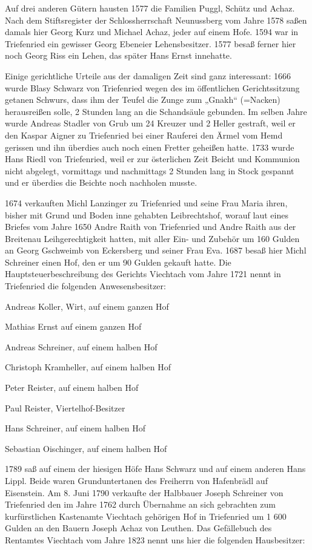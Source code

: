 \documentclass[12pt,a4pager]{book}
\begin{document}
Auf drei anderen Gütern hausten 1577 die Familien Puggl, Schütz und Achaz. Nach
dem Stiftsregister der Schlossherrschaft Neunussberg vom Jahre 1578 saßen damals
hier Georg Kurz und Michael Achaz, jeder auf einem Hofe. 1594 war in Triefenried
ein gewisser Georg Ebeneier Lehensbesitzer. 1577 besaß ferner hier noch Georg
Riss ein Lehen, das später Hans Ernst innehatte.

Einige gerichtliche Urteile aus der damaligen Zeit sind ganz interessant: 1666
wurde Blasy Schwarz von Triefenried wegen des im öffentlichen Gerichtssitzung
getanen Schwurs, dass ihm der Teufel die Zunge zum „Gnakh“ (=Nacken)
herausreißen solle, 2 Stunden lang an die Schandsäule gebunden. Im selben Jahre
wurde Andreas Stadler von Grub um 24 Kreuzer und 2 Heller gestraft, weil er den
Kaspar Aigner zu Triefenried bei einer Rauferei den Ärmel vom Hemd gerissen und
ihn überdies auch noch einen Fretter geheißen hatte. 1733 wurde Hans Riedl von
Triefenried, weil er zur österlichen Zeit Beicht und Kommunion nicht abgelegt,
vormittags und nachmittags 2 Stunden lang in Stock gespannt und er überdies die
Beichte noch nachholen musste.

1674 verkauften Michl Lanzinger zu Triefenried und seine Frau Maria ihren,
bisher mit Grund und Boden inne gehabten Leibrechtshof, worauf laut eines
Briefes vom Jahre 1650 Andre Raith von Triefenried und Andre Raith aus der
Breitenau Leihgerechtigkeit hatten, mit aller Ein- und Zubehör um 160 Gulden an
Georg Gschweimb von Eckersberg und seiner Frau Eva. 1687 besaß hier Michl
Schreiner einen Hof, den er um 90 Gulden gekauft hatte. Die
Hauptsteuerbeschreibung des Gerichts Viechtach vom Jahre 1721 nennt in
Triefenried die folgenden Anwesensbesitzer:

Andreas Koller, Wirt, auf einem ganzen Hof

Mathias Ernst auf einem ganzen Hof

Andreas Schreiner, auf einem halben Hof

Christoph Kramheller, auf einem halben Hof

Peter Reister, auf einem halben Hof

Paul Reister, Viertelhof-Besitzer

Hans Schreiner, auf einem halben Hof

Sebastian Oischinger, auf einem halben Hof

1789 saß auf einem der hiesigen Höfe Hans Schwarz und auf einem anderen Hans
Lippl. Beide waren Grunduntertanen des Freiherrn von Hafenbrädl auf Eisenstein.
Am 8. Juni 1790 verkaufte der Halbbauer Joseph Schreiner von Triefenried den im
Jahre 1762 durch Übernahme an sich gebrachten zum kurfürstlichen Kastenamte
Viechtach gehörigen Hof in Triefenried um 1 600 Gulden an den Bauern Joseph
Achaz von Leuthen. Das Gefällebuch des Rentamtes Viechtach vom Jahre 1823 nennt
uns hier die folgenden Hausbesitzer:
\end{document}
